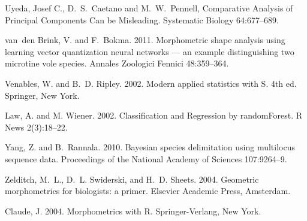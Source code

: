 \documentclass[12pt,letterpaper]{article}
\begin{document}
\begin{thebibliography}{77}
    Uyeda, Josef C., D.~S.~Caetano and M.~W.~Pennell, {Comparative Analysis of 
    Principal Components Can be Misleading}. Systematic Biology 64:677--689.
    

    van~den Brink, V. and F.~Bokma. 2011. {Morphometric shape analysis using
      learning vector quantization neural networks — an example distinguishing
    two microtine vole species}. Annales Zoologici Fennici 48:359--364.

    Venables, W. and B.~D. Ripley. 2002. {Modern applied statistics with S}. 4th
    ed. Springer, New York.

    Law, A. and M. Wiener. 2002. {Classification and Regression by randomForest.} 
    R News 2(3):18--22.
    
    Yang, Z. and B.~Rannala. 2010. {Bayesian species delimitation using multilocus
    sequence data.} Proceedings of the National Academy of Sciences 107:9264--9.

    Zelditch, M.~L., D.~L. Swiderski, and H.~D. Sheets. 2004. {Geometric
    morphometrics for biologists: a primer}. Elsevier Academic Press, Amsterdam.

    Claude, J. 2004. {Morphometrics with R}. Springer-Verlang, New York.
    

\end{thebibliography}
\end{document}

